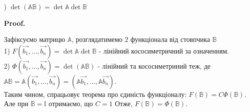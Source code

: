 \documentclass[a4paper, 10pt]{article}
\makeatletter
\theoremstyle{theoremdd}
\renewenvironment{proof}[1][Proof.\\]{\par
\pushQED{\hfill \qed}%
\normalfont \topsep6\p@\@plus6\p@\relax
\trivlist
\item\relax
{\bfseries
#1\@addpunct{.}}\hspace\labelsep\ignorespaces
}{%
\popQED\endtrivlist\@endpefalse
}
\makeatother
\begin{document}
\iffalse
Варто змінити рядки місцями, щоб діагональні елементи були ненульовими. Якщо так станеться, що   А далі мета - зробити перетворення, щоб під діагональними елементами всі вони були нулевими\\
$= (-1)^? \det \begin{pmatrix} 
\tilde{a_{11}} & \tilde{a_{12}} & \tilde{a_{13}} & \dots & \tilde{a_{1n}} \\
0 & \tilde{a_{22}} & \tilde{a_{23}} & \dots & \tilde{a_{2n}} \\
0 & 0 & \tilde{a_{33}} & \dots & \tilde{a_{3n}} \\
\vdots & \vdots & \vdots & \ddots & \vdots \\
0 & 0 & 0 & \dots & \tilde{a_{nn}} \\
\end{pmatrix} = $\\
Якщо розкрити за першим стовпчиком, то ми отримаємо добуток діагональних елементів\\
$ = (-1)^? \tilde{a_{11}}\tilde{a_{22}}\tilde{a_{33}}\dots \tilde{a_{nn}}$
\fi
{}) $\det (\mathbb{A} \mathbb{B}) = \det \mathbb{A} \det \mathbb{B}$
\begin{proof}
Зафіксуємо матрицю $\mathbb{A}$, розглядатимемо 2 функціонала від стовпчика $\mathbb{B}$\\
1) $F(\vec{b_1},\dots, \vec{b_n}) = \det \mathbb{A} \det \mathbb{B}$ - лінійний кососиметричний за означенням.\\
2) $\Phi(\vec{b_1},\dots, \vec{b_n}) = \det(\mathbb{A}\mathbb{B})$ - лінійний та кососиметриний теж, де $\mathbb{A}\mathbb{B} = \mathbb{A}(\vec{b_1},\dots, \vec{b_n}) = (\mathbb{A}\vec{b_1},\dots, \mathbb{A}\vec{b_n})$.\\
Таким чином, спрацьовує теорема про єдиність функціоналу: $F(\mathbb{B}) = C \Phi(\mathbb{B})$.\\
Але при $\mathbb{B} = \mathbb{I}$ отримаємо, що $C=1$ Отже, $F(\mathbb{B}) = \Phi(\mathbb{B})$.
\end{proof}
\end{document}
